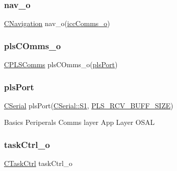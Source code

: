 \subsubsection{\texorpdfstring{nav\_o}{nav\_o}}
{\footnotesize\ttfamily \mbox{\hyperlink{class_c_navigation}{C\+Navigation}} nav\+\_\+o(\mbox{\hyperlink{_a_d_a_s___nav_u_8ino_a62ef6b3308259edb69af585549178324}{icc\+Comms\+\_\+o}})}

\mbox{\label{_a_d_a_s___nav_u_8ino_add0df3806d74ba741b1d6bc5452d7e79}} 
\subsubsection{\texorpdfstring{plsCOmms\_o}{plsCOmms\_o}}
{\footnotesize\ttfamily \mbox{\hyperlink{class_c_p_l_s_comms}{C\+P\+L\+S\+Comms}} pls\+C\+Omms\+\_\+o(\mbox{\hyperlink{_a_d_a_s___nav_u_8ino_a5427ed2b254fc7bb97bb9c8b92af7d60}{pls\+Port}})}

\mbox{\label{_a_d_a_s___nav_u_8ino_a5427ed2b254fc7bb97bb9c8b92af7d60}} 
\subsubsection{\texorpdfstring{plsPort}{plsPort}}
{\footnotesize\ttfamily \mbox{\hyperlink{class_c_serial}{C\+Serial}} pls\+Port(\mbox{\hyperlink{class_c_serial_a000039540cc90b18bafacf5744e7eda2a2a245d3c55e5b6e7052daf261924ce08}{C\+Serial\+::\+S1}}, \mbox{\hyperlink{_a_d_a_s___cfg_8h_a00f72db64cf681b08d61977df126ec76}{P\+L\+S\+\_\+\+R\+C\+V\+\_\+\+B\+U\+F\+F\+\_\+\+S\+I\+ZE}})}

Basics Periperals Comms layer App Layer O\+S\+AL \mbox{\label{_a_d_a_s___nav_u_8ino_a4e98d90206033e0ef6b58d0d11930bac}} 
\subsubsection{\texorpdfstring{taskCtrl\_o}{taskCtrl\_o}}
{\footnotesize\ttfamily \mbox{\hyperlink{class_c_task_ctrl}{C\+Task\+Ctrl}} task\+Ctrl\+\_\+o}



